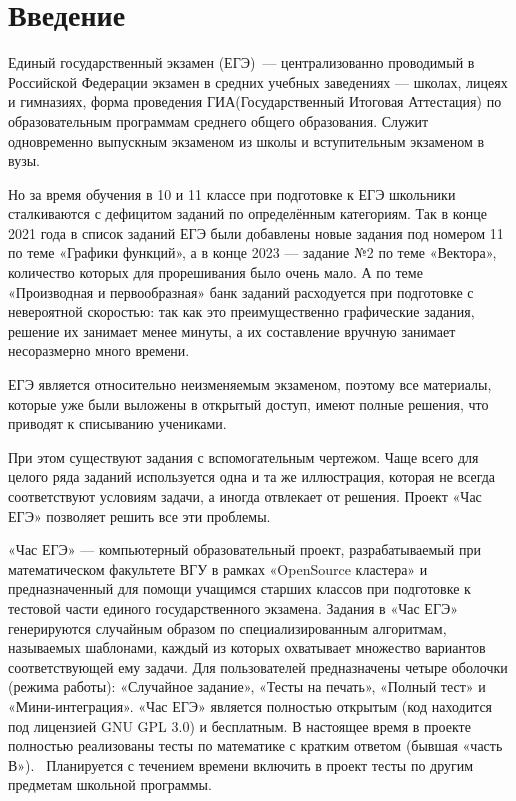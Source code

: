 
\section*{Введение}
Единый государственный экзамен (ЕГЭ)~— централизованно проводимый в Российской
Федерации экзамен в средних учебных заведениях — школах, лицеях и гимназиях,
форма проведения ГИА(Государственный Итоговая Аттестация) по образовательным программам среднего общего образования.
Служит одновременно выпускным экзаменом из школы и вступительным экзаменом в вузы.

Но за время обучения в 10 и 11 классе при подготовке к ЕГЭ школьники сталкиваются с дефицитом заданий по определённым категориям.
Так в конце 2021 года в список заданий ЕГЭ были добавлены новые задания под номером 11 по теме «Графики функций», а в конце 2023 — задание №2 по теме «Вектора», количество которых для прорешивания было очень мало. 
А по теме «Производная и первообразная» банк заданий расходуется при подготовке с невероятной скоростью:
так как это преимущественно графические задания, решение их занимает менее минуты, а их составление вручную занимает несоразмерно много времени.

ЕГЭ является относительно неизменяемым экзаменом, поэтому все материалы, которые уже были выложены в открытый доступ, имеют полные решения, что приводят к списыванию учениками.

При этом существуют задания с вспомогательным чертежом. Чаще всего для целого ряда заданий используется одна и та же иллюстрация, которая не всегда соответствуют условиям задачи, а иногда отвлекает от решения.
Проект «Час ЕГЭ» позволяет решить все эти проблемы.

«Час ЕГЭ» — компьютерный образовательный проект, разрабатываемый при математическом
факультете ВГУ в рамках «OpenSource кластера» и предназначенный для помощи учащимся
старших классов при подготовке к тестовой части единого государственного экзамена.
Задания в «Час ЕГЭ» генерируются случайным образом по специализированным алгоритмам,
называемых шаблонами, каждый из которых
охватывает множество вариантов соответствующей ему задачи. Для
пользователей
предназначены четыре оболочки (режима работы): «Случайное задание», «Тесты на печать»,
«Полный тест» и «Мини-интеграция».
«Час ЕГЭ» является полностью открытым (код находится под лицензией GNU GPL 3.0)
и бесплатным.
В настоящее время в проекте полностью реализованы тесты по математике с кратким
ответом (бывшая «часть В»).~\cite{fipi}
Планируется с течением времени включить в проект тесты по другим предметам школьной
программы.

